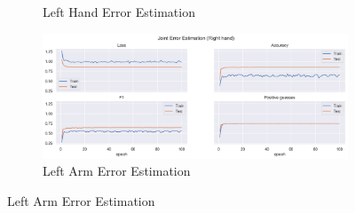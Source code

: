 \begin{figure}[!ht]
\begin{subfigure}[b]{0.47\linewidth}
        \caption{Left Hand Error Estimation}
        \label{fig:v2_leha_jt_ee}
    \end{subfigure}
    \hfill
    \begin{subfigure}[b]{0.47\linewidth}
        \centering
        \includegraphics[width=\textwidth]{figures/Results/v2_bs_40_is_64_e_100/jt/Right hand_ErrorEstimation.png}
        \caption{Left Arm Error Estimation}
        \label{fig:v2_riha_jt_ee}
    \end{subfigure}
  \end{figure}
  
